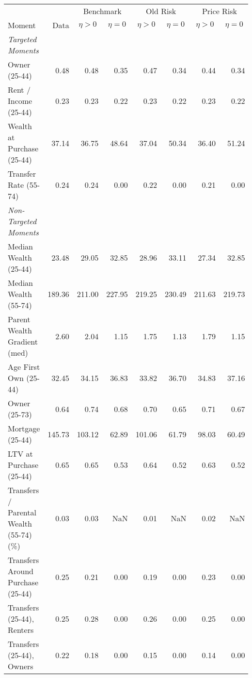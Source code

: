 \begin{tabular}{lr rr rr rr}
 \toprule & & \multicolumn{2}{c}{Benchmark} & \multicolumn{2}{c}{Old Risk} & \multicolumn{2}{c}{Price Risk}
 \\  \cmidrule(lr){3-4}\cmidrule(lr){5-6}\cmidrule(lr){7-8}
Moment & Data & \multicolumn{1}{c}{$ \eta>0 $} & \multicolumn{1}{c}{$ \eta=0 $} & \multicolumn{1}{c}{$ \eta>0 $} & \multicolumn{1}{c}{$ \eta=0 $} & \multicolumn{1}{c}{$ \eta>0 $} & \multicolumn{1}{c}{$ \eta=0 $}\\
\midrule
\textit{Targeted Moments} &  &  &  &  &  &  & \\
\;Owner (25-44) & 0.48 & 0.48 & 0.35 & 0.47 & 0.34 & 0.44 & 0.34\\
\;Rent / Income (25-44) & 0.23 & 0.23 & 0.22 & 0.23 & 0.22 & 0.23 & 0.22\\
\;Wealth at Purchase (25-44) & 37.14 & 36.75 & 48.64 & 37.04 & 50.34 & 36.40 & 51.24\\
\;Transfer Rate (55-74) & 0.24 & 0.24 & 0.00 & 0.22 & 0.00 & 0.21 & 0.00\\
\textit{Non-Targeted Moments} &  &  &  &  &  &  & \\
\;Median Wealth (25-44) & 23.48 & 29.05 & 32.85 & 28.96 & 33.11 & 27.34 & 32.85\\
\;Median Wealth (55-74) & 189.36 & 211.00 & 227.95 & 219.25 & 230.49 & 211.63 & 219.73\\
\;Parent Wealth Gradient (med) & 2.60 & 2.04 & 1.15 & 1.75 & 1.13 & 1.79 & 1.15\\
\;Age First Own (25-44) & 32.45 & 34.15 & 36.83 & 33.82 & 36.70 & 34.83 & 37.16\\
\;Owner (25-73) & 0.64 & 0.74 & 0.68 & 0.70 & 0.65 & 0.71 & 0.67\\
\;Mortgage (25-44) & 145.73 & 103.12 & 62.89 & 101.06 & 61.79 & 98.03 & 60.49\\
\;LTV at Purchase (25-44) & 0.65 & 0.65 & 0.53 & 0.64 & 0.52 & 0.63 & 0.52\\
\;Transfers / Parental Wealth (55-74) (\%) & 0.03 & 0.03 & NaN & 0.01 & NaN & 0.02 & NaN\\
\;Transfers Around Purchase (25-44) & 0.25 & 0.21 & 0.00 & 0.19 & 0.00 & 0.23 & 0.00\\
\;Transfers (25-44), Renters & 0.25 & 0.28 & 0.00 & 0.26 & 0.00 & 0.25 & 0.00\\
\;Transfers (25-44), Owners & 0.22 & 0.18 & 0.00 & 0.15 & 0.00 & 0.14 & 0.00\\
\bottomrule
\end{tabular}
